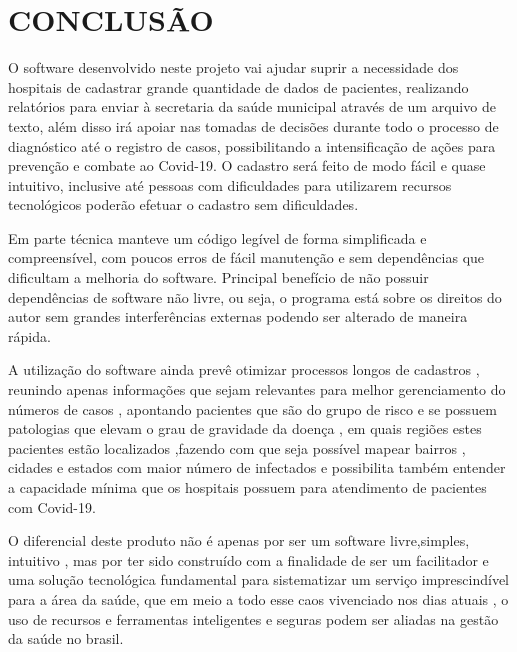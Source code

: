\documentclass[
	12pt,				%
	oneside,			%
	a4paper,			%
  section=TITLE,
	brazil,				%
	]{abntex2}
\begin{document}
\section{CONCLUSÃO}
O software desenvolvido neste projeto vai ajudar suprir a
necessidade dos hospitais de cadastrar grande quantidade de dados de pacientes,
realizando relatórios para enviar à secretaria da saúde municipal através de um
arquivo de texto, além disso irá apoiar nas tomadas de decisões durante todo o
processo de diagnóstico até o registro de casos, possibilitando a
intensificação de ações para prevenção e combate ao Covid-19. O cadastro será
feito de modo fácil e quase intuitivo, inclusive até pessoas com dificuldades
para utilizarem recursos tecnológicos poderão efetuar o cadastro sem
dificuldades.

Em parte técnica manteve um código legível de forma simplificada e
compreensível, com poucos erros de fácil manutenção e sem dependências que
dificultam a melhoria do software. Principal benefício de não possuir
dependências de software não livre, ou seja, o programa está sobre os direitos
do autor sem grandes interferências externas podendo ser alterado de maneira
rápida. 

A utilização do software ainda prevê otimizar processos longos de cadastros ,
reunindo apenas informações que sejam relevantes para melhor gerenciamento do
números de casos , apontando pacientes que são do grupo de risco e se possuem
patologias que elevam o grau de gravidade da doença , em quais regiões estes
pacientes estão localizados ,fazendo com que seja possível mapear bairros ,
cidades e estados com maior número de infectados e possibilita também entender
a capacidade mínima que os hospitais possuem para atendimento de pacientes com
Covid-19.

O diferencial deste produto não é apenas por ser um software livre,simples,
intuitivo , mas por ter sido construído com a finalidade de ser um facilitador
e uma solução tecnológica fundamental para sistematizar um serviço
imprescindível para a área da saúde, que em meio a todo esse caos vivenciado
nos dias atuais , o uso de recursos e ferramentas inteligentes e seguras podem
ser aliadas na gestão da saúde no brasil.

\postextual


\end{document}

